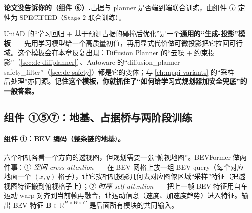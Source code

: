 
\begin{note}
\textbf{论文没告诉你的（组件 ⑥）.}\;占据与 planner 是否端到端联合训练，由组件 ⑦ 定性为 SPECIFIED（Stage 2 联合训练）。
\end{note}

\begin{insight}
UniAD 的“学习回归 $+$ 基于预测占据的碰撞后优化”是一个\textbf{通用的“生成-投影”模板}——先用学习模型给一个高质量初值，再用显式代价做可微投影把它拉回可行域。这个模板会在本章反复出现：Diffusion Planner 的“去噪 $+$ 约束投影”（\cref{sec:de-diffplanner}）、Autoware 的“diffusion\_planner $+$ safety\_filter”（\cref{sec:de-safety}）都是它的变体；与 \cref{ch:mppi-variants} 的“采样 $+$ 后处理”亦同源。\textbf{记住这个模板，你就抓住了“如何给学习式规划器加安全兜底”的一般答案。}
\end{insight}

\subsection{组件 ①⑤⑦：地基、占据桥与两阶段训练}
\label{sec:de-uniad-rest}

\paragraph{组件 ①：BEV 编码（整条链的地基）。}
六个相机各看一个方向的透视图，但规划需要一张“俯视地图”。BEVFormer 做两件事：① \emph{空间 cross-attention}——在 BEV 网格上放一组 BEV query（每个对应地面一个 $(x,y)$ 格子），让它按相机投影几何去对应图像区域“采样”特征（把透视图特征搬到俯视格子上）；② \emph{时序 self-attention}——把上一帧 BEV 特征用自车运动 warp 对齐到当前帧再融合，让运动信息（速度、加速度趋势）进入特征。输出 BEV 特征 $\mathbf{B}\in\mathbb{R}^{H\times W\times C}$ 是后面所有模块的共同输入。

